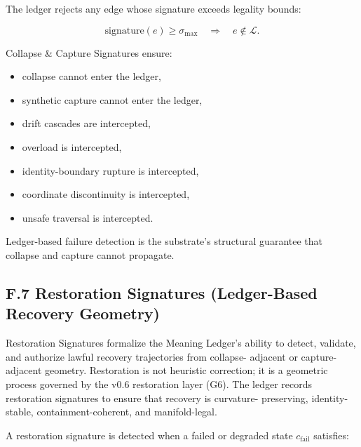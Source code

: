 \medskip

\noindent The ledger rejects any edge whose signature exceeds legality bounds:


\[
\text{signature}(e) \ge \sigma_{\max}
\quad \Longrightarrow \quad
e \notin \mathcal{L}.
\]



\medskip

\noindent Collapse & Capture Signatures ensure:

\begin{itemize}
    \item collapse cannot enter the ledger,
    \item synthetic capture cannot enter the ledger,
    \item drift cascades are intercepted,
    \item overload is intercepted,
    \item identity-boundary rupture is intercepted,
    \item coordinate discontinuity is intercepted,
    \item unsafe traversal is intercepted.
\end{itemize}

\medskip

\noindent Ledger-based failure detection is the substrate’s structural guarantee
that collapse and capture cannot propagate.



\subsection*{F.7 Restoration Signatures (Ledger-Based Recovery Geometry)}

\noindent Restoration Signatures formalize the Meaning Ledger’s ability to
detect, validate, and authorize lawful recovery trajectories from collapse-
adjacent or capture-adjacent geometry. Restoration is not heuristic correction;
it is a geometric process governed by the v0.6 restoration layer (G6). The
ledger records restoration signatures to ensure that recovery is curvature-
preserving, identity-stable, containment-coherent, and manifold-legal.

\medskip

\noindent A restoration signature is detected when a failed or degraded state
$c_{\mathrm{fail}}$ satisfies:


